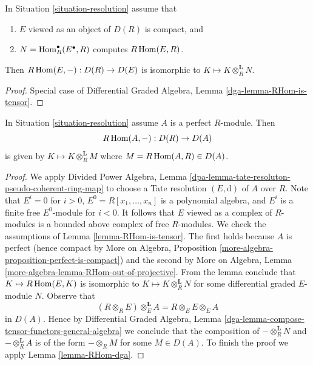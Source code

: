 \begin{lemma}
\label{lemma-RHom-is-tensor}
In Situation \ref{situation-resolution} assume that
\begin{enumerate}
\item $E$ viewed as an object of $D(R)$ is compact, and
\item $N = \mathop{\mathrm{Hom}}\nolimits^\bullet_R(E^\bullet, R)$ computes $R\mathop{\mathrm{Hom}}\nolimits(E, R)$.
\end{enumerate}
Then $R\mathop{\mathrm{Hom}}\nolimits(E, -) : D(R) \to D(E)$ is isomorphic to
$K \mapsto K \otimes_R^\mathbf{L} N$.
\end{lemma}

\begin{proof}
Special case of Differential Graded Algebra, Lemma
\ref{dga-lemma-RHom-is-tensor}.
\end{proof}

\begin{lemma}
\label{lemma-RHom-is-tensor-special}
In Situation \ref{situation-resolution} assume $A$ is a perfect $R$-module.
Then
$$
R\mathop{\mathrm{Hom}}\nolimits(A, -) : D(R) \to D(A)
$$
is given by $K \mapsto K \otimes_R^\mathbf{L} M$
where $M = R\mathop{\mathrm{Hom}}\nolimits(A, R) \in D(A)$.
\end{lemma}

\begin{proof}
We apply Divided Power Algebra, Lemma
\ref{dpa-lemma-tate-resoluton-pseudo-coherent-ring-map}
to choose a Tate resolution $(E, \text{d})$ of $A$ over $R$.
Note that $E^i = 0$ for $i > 0$, $E^0 = R[x_1, \ldots, x_n]$
is a polynomial algebra, and $E^i$ is a finite free $E^0$-module
for $i < 0$. It follows that $E$ viewed as a complex of $R$-modules
is a bounded above complex of free $R$-modules.
We check the assumptions of Lemma \ref{lemma-RHom-is-tensor}.
The first holds because $A$ is perfect
(hence compact by More on Algebra, Proposition
\ref{more-algebra-proposition-perfect-is-compact})
and the second by
More on Algebra, Lemma \ref{more-algebra-lemma-RHom-out-of-projective}.
From the lemma conclude that $K \mapsto R\mathop{\mathrm{Hom}}\nolimits(E, K)$ is
isomorphic to $K \mapsto K \otimes_R^\mathbf{L} N$ for
some differential graded $E$-module $N$. Observe that
$$
(R \otimes_R E) \otimes_E^\mathbf{L} A = R \otimes_E E \otimes_E A
$$
in $D(A)$. Hence by Differential Graded Algebra, Lemma
\ref{dga-lemma-compose-tensor-functors-general-algebra}
we conclude that the composition of
$- \otimes_R^\mathbf{L} N$ and $- \otimes_R^\mathbf{L} A$
is of the form $- \otimes_R M$ for some $M \in D(A)$.
To finish the proof we apply Lemma \ref{lemma-RHom-dga}.
\end{proof}

